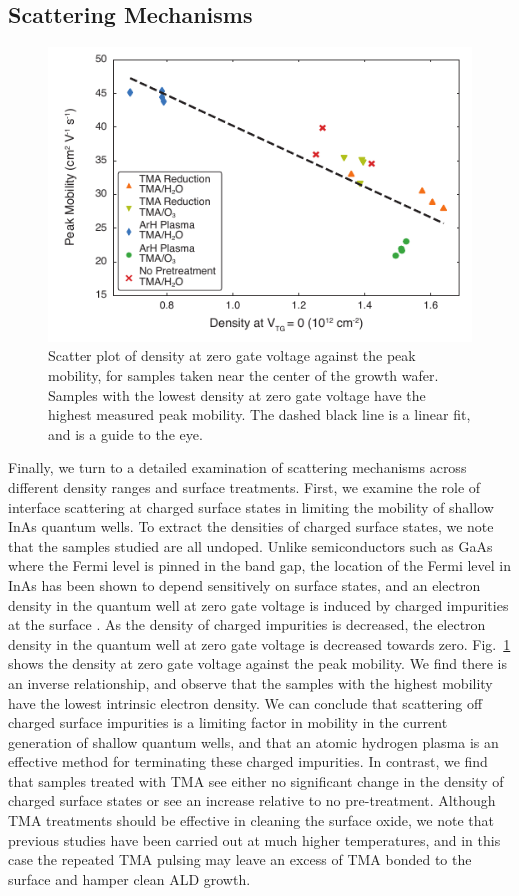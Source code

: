 \subsection{\label{sec:surf_scat}Scattering Mechanisms}

\begin{figure}
    \includegraphics[width=0.6\linewidth]{Figure5}
    \caption[Density at zero gate voltage vs. peak mobility]{\label{fig:surf_fig5}Scatter plot of density at zero gate voltage against the peak mobility, for samples taken near the center of the growth wafer. Samples with the lowest density at zero gate voltage have the highest measured peak mobility. The dashed black line is a linear fit, and is a guide to the eye.}
\end{figure}

Finally, we turn to a detailed examination of scattering mechanisms across different density ranges and surface treatments. First, we examine the role of interface scattering at charged surface states in limiting the mobility of shallow InAs quantum wells. To extract the densities of charged surface states, we note that the samples studied are all undoped. Unlike semiconductors such as GaAs where the Fermi level is pinned in the band gap, the location of the Fermi level in InAs has been shown to depend sensitively on surface states, and an electron density in the quantum well at zero gate voltage is induced by charged impurities at the surface \cite{PhysRevLett.66.2243,Affentauschegg_2001}. As the density of charged impurities is decreased, the electron density in the quantum well at zero gate voltage is decreased towards zero. Fig.~\ref{fig:surf_fig5} shows the density at zero gate voltage against the peak mobility. We find there is an inverse relationship, and observe that the samples with the highest mobility have the lowest intrinsic electron density. We can conclude that scattering off charged surface impurities is a limiting factor in mobility in the current generation of shallow quantum wells, and that an atomic hydrogen plasma is an effective method for terminating these charged impurities. In contrast, we find that samples treated with TMA see either no significant change in the density of charged surface states or see an increase relative to no pre-treatment. Although TMA treatments should be effective in cleaning the surface oxide, we note that previous studies have been carried out at much higher temperatures, and in this case the repeated TMA pulsing may leave an excess of TMA bonded to the surface and hamper clean ALD growth.

